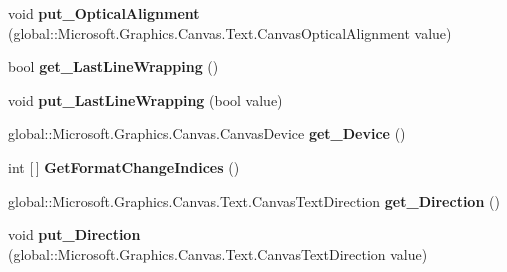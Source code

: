 \begin{DoxyCompactItemize}
void {\bfseries put\+\_\+\+Optical\+Alignment} (global\+::\+Microsoft.\+Graphics.\+Canvas.\+Text.\+Canvas\+Optical\+Alignment value)
\item 
\mbox{\label{interface_microsoft_1_1_graphics_1_1_canvas_1_1_text_1_1_i_canvas_text_layout_af335bf16dd7057ce2706ba964c165998}} 
bool {\bfseries get\+\_\+\+Last\+Line\+Wrapping} ()
\item 
\mbox{\label{interface_microsoft_1_1_graphics_1_1_canvas_1_1_text_1_1_i_canvas_text_layout_adeb3fc37708660c2d3ff7a49349a4f43}} 
void {\bfseries put\+\_\+\+Last\+Line\+Wrapping} (bool value)
\item 
\mbox{\label{interface_microsoft_1_1_graphics_1_1_canvas_1_1_text_1_1_i_canvas_text_layout_ac15a95c4a7796e189425d1953df24949}} 
global\+::\+Microsoft.\+Graphics.\+Canvas.\+Canvas\+Device {\bfseries get\+\_\+\+Device} ()
\item 
\mbox{\label{interface_microsoft_1_1_graphics_1_1_canvas_1_1_text_1_1_i_canvas_text_layout_a73f2d2dac663dc66cf5846e351b3ecb5}} 
int \mbox{[}$\,$\mbox{]} {\bfseries Get\+Format\+Change\+Indices} ()
\item 
\mbox{\label{interface_microsoft_1_1_graphics_1_1_canvas_1_1_text_1_1_i_canvas_text_layout_adcf04927cfc8f87ca62aed637107ecc8}} 
global\+::\+Microsoft.\+Graphics.\+Canvas.\+Text.\+Canvas\+Text\+Direction {\bfseries get\+\_\+\+Direction} ()
\item 
\mbox{\label{interface_microsoft_1_1_graphics_1_1_canvas_1_1_text_1_1_i_canvas_text_layout_a7e880bd0b063a9b01869580d1fa1dc3a}} 
void {\bfseries put\+\_\+\+Direction} (global\+::\+Microsoft.\+Graphics.\+Canvas.\+Text.\+Canvas\+Text\+Direction value)
\item 
\mbox{\label{interface_microsoft_1_1_graphics_1_1_canvas_1_1_text_1_1_i_canvas_text_layout_ae9a3d34571d57d80cd0bf928ae229311}} 

\end{DoxyCompactItemize}
